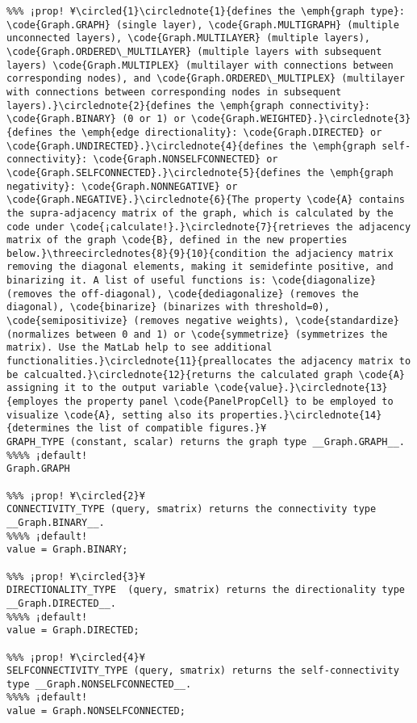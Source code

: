 \documentclass{tufte-handout}
\begin{document}
\begin{lstlisting}
%%% ¡prop! ¥\circled{1}\circlednote{1}{defines the \emph{graph type}: \code{Graph.GRAPH} (single layer), \code{Graph.MULTIGRAPH} (multiple unconnected layers), \code{Graph.MULTILAYER} (multiple layers), \code{Graph.ORDERED\_MULTILAYER} (multiple layers with subsequent layers) \code{Graph.MULTIPLEX} (multilayer with connections between corresponding nodes), and \code{Graph.ORDERED\_MULTIPLEX} (multilayer with connections between corresponding nodes in subsequent layers).}\circlednote{2}{defines the \emph{graph connectivity}: \code{Graph.BINARY} (0 or 1) or \code{Graph.WEIGHTED}.}\circlednote{3}{defines the \emph{edge directionality}: \code{Graph.DIRECTED} or \code{Graph.UNDIRECTED}.}\circlednote{4}{defines the \emph{graph self-connectivity}: \code{Graph.NONSELFCONNECTED} or \code{Graph.SELFCONNECTED}.}\circlednote{5}{defines the \emph{graph negativity}: \code{Graph.NONNEGATIVE} or \code{Graph.NEGATIVE}.}\circlednote{6}{The property \code{A} contains the supra-adjacency matrix of the graph, which is calculated by the code under \code{¡calculate!}.}\circlednote{7}{retrieves the adjacency matrix of the graph \code{B}, defined in the new properties below.}\threecirclednotes{8}{9}{10}{condition the adjaciency matrix removing the diagonal elements, making it semidefinte positive, and binarizing it. A list of useful functions is: \code{diagonalize} (removes the off-diagonal), \code{dediagonalize} (removes the diagonal), \code{binarize} (binarizes with threshold=0), \code{semipositivize} (removes negative weights), \code{standardize} (normalizes between 0 and 1) or \code{symmetrize} (symmetrizes the matrix). Use the MatLab help to see additional functionalities.}\circlednote{11}{preallocates the adjacency matrix to be calcualted.}\circlednote{12}{returns the calculated graph \code{A} assigning it to the output variable \code{value}.}\circlednote{13}{employes the property panel \code{PanelPropCell} to be employed to visualize \code{A}, setting also its properties.}\circlednote{14}{determines the list of compatible figures.}¥
GRAPH_TYPE (constant, scalar) returns the graph type __Graph.GRAPH__.
%%%% ¡default!
Graph.GRAPH

%%% ¡prop! ¥\circled{2}¥
CONNECTIVITY_TYPE (query, smatrix) returns the connectivity type __Graph.BINARY__.
%%%% ¡default!
value = Graph.BINARY;

%%% ¡prop! ¥\circled{3}¥
DIRECTIONALITY_TYPE  (query, smatrix) returns the directionality type __Graph.DIRECTED__.
%%%% ¡default! 
value = Graph.DIRECTED;

%%% ¡prop! ¥\circled{4}¥
SELFCONNECTIVITY_TYPE (query, smatrix) returns the self-connectivity type __Graph.NONSELFCONNECTED__.
%%%% ¡default!
value = Graph.NONSELFCONNECTED;


\end{lstlisting}
\end{document}
